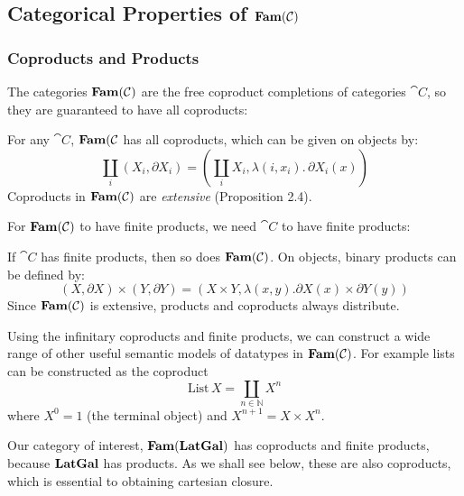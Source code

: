 \subsection{Categorical Properties of $\mathbf{Fam}(\mathcal{C})$}

\subsubsection{Coproducts and Products}

The categories $\mathbf{Fam}(\mathcal{C})$ are the free coproduct completions of
categories $\cat{C}$, so they are guaranteed to have all coproducts:

\begin{proposition}
  For any $\cat{C}$, $\mathbf{Fam}(\mathcal{C}$ has all coproducts, which can be
  given on objects by:
  \begin{displaymath}
    \coprod_i (X_i, \partial X_i) = (\coprod_i X_i, \lambda (i, x_i).\, \partial X_i(x))
  \end{displaymath}
  Coproducts in $\mathbf{Fam}(\mathcal{C})$ are \emph{extensive}
  \cite{carboni-lack-walters93} (Proposition 2.4).
\end{proposition}

For $\mathbf{Fam}(\mathcal{C})$ to have finite products, we need $\cat{C}$ to have
finite products:

\begin{proposition}
  If $\cat{C}$ has finite products, then so does $\mathbf{Fam}(\mathcal{C})$. On
  objects, binary products can be defined by:
  \begin{displaymath}
    (X, \partial X) \times (Y, \partial Y) = (X \times Y, \lambda (x, y). \partial X(x) \times \partial Y(y))
  \end{displaymath}
  Since $\mathbf{Fam}(\mathcal{C})$ is extensive, products and coproducts always
  distribute.
\end{proposition}

Using the infinitary coproducts and finite products, we can construct
a wide range of other useful semantic models of datatypes in
$\mathbf{Fam}(\mathcal{C})$. For example lists can be constructed as the coproduct
\begin{displaymath}
  \mathrm{List}\,X = \coprod_{n \in \mathbb{N}} X^n
\end{displaymath}
where $X^0 = 1$ (the terminal object) and $X^{n+1} = X \times X^n$.

Our category of interest, $\mathbf{Fam}(\mathbf{LatGal})$ has coproducts and finite
products, because $\mathbf{LatGal}$ has products. As we shall see below, these
are also coproducts, which is essential to obtaining cartesian
closure.

